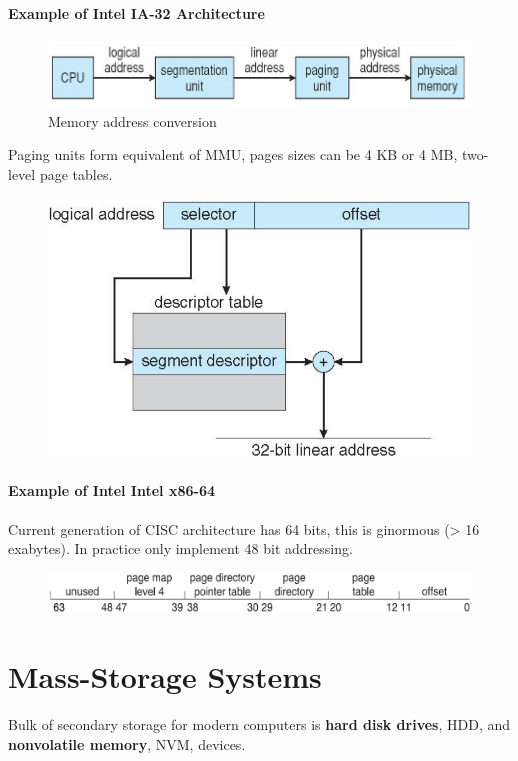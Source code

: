 \subsubsection{Example of Intel IA-32 Architecture}

\begin{figure}[h!]
    \centering
    \includegraphics[width=0.65\linewidth]{img/dddbv.png}
    \caption{Memory address conversion}
\end{figure}

Paging units form equivalent of MMU, pages sizes can be 4 KB or 4 MB, two-level page tables.

\begin{figure}[h!]
    \centering
    \includegraphics[width=0.55\linewidth]{img/abdv.png}
\end{figure}


\subsubsection{Example of Intel Intel x86-64}

Current generation of CISC architecture has 64 bits, this is ginormous  (> 16 exabytes). In practice only implement 48 bit addressing.

\begin{figure}[h!]
    \centering
    \includegraphics[width=0.9\linewidth]{img/fmhh.png}
\end{figure}


\chapter{Mass-Storage Systems}

Bulk of secondary storage for modern computers is \textbf{ hard disk drives}, HDD, and \textbf{nonvolatile memory}, NVM, devices.

